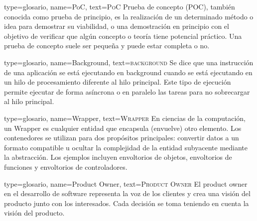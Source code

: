 {
type={glosario},
name={PoC},
text={\textsc{PoC}}
}
{
Prueba de concepto (POC), también conocida como prueba de principio, es la realización de un determinado método o idea para demostrar su viabilidad, o una demostración en principio con el objetivo de verificar que algún concepto o teoría tiene potencial práctico. Una prueba de concepto suele ser pequeña y puede estar completa o no.
}

{
type={glosario},
name={Background},
text={\textsc{background}}
}
{ Se dice que una instrucción de una aplicación se está ejecutando en background cuando se está ejecutando en un hilo de procesamiento diferente al hilo principal. Este tipo de ejecución permite ejecutar de forma asíncrona o en paralelo las tareas para no sobrecargar al hilo principal.
}

{
type={glosario},
name={Wrapper},
text={\textsc{Wrapper}}
}
{En ciencias de la computación, un Wrapper es cualquier entidad que encapsula (envuelve) otro elemento. Los contenedores se utilizan para dos propósitos principales: convertir datos a un formato compatible u ocultar la complejidad de la entidad subyacente mediante la abstracción. Los ejemplos incluyen envoltorios de objetos, envoltorios de funciones y envoltorios de controladores. }


{
type={glosario},
name={Product Owner},
text={\textsc{Product Owner}}
}
{ El product owner en el desarrollo de software representa la voz de los clientes y crea una visión del producto junto con los interesados. Cada decisión se toma teniendo en cuenta la visión del producto. }





